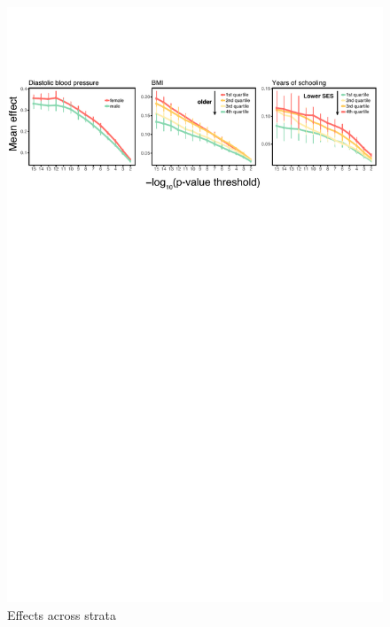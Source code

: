 \documentclass[hidelinks, 12pt]{article}
\begin{document}
\begin{figure}[h!]
\centering
\includegraphics[width=\textwidth]{./supp_figures/beta_sweep.pdf}
\caption{Effects across strata}
\end{figure}
\end{document}
